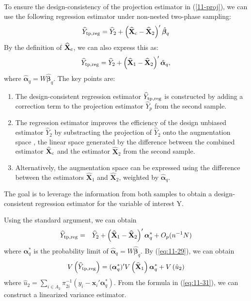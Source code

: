 \documentclass[12pt]{article}
\newcommand{\bx}{\mathbf{x}}
\begin{document}
To ensure the design-consistency of the projection estimator in (\ref{11-proj}), we can use the following regression estimator under non-nested two-phase sampling:
\begin{equation}
\widehat{Y}_{\rm tp, reg} = \widehat{Y}_2 + \left( \widehat{\mathbf{X}}_{\rm c} - \widehat{\mathbf{X}}_2 \right)' \hat{\bm \beta}_q
\label{eq:11-28}
\end{equation} 
By the definition of $\widehat{\mathbf{X}}_{\rm c}$, we can also express this as: 
\begin{equation}
\widehat{Y}_{\rm tp, reg} = \widehat{Y}_2 + \left( \widehat{\mathbf{X}}_{1} - \widehat{\mathbf{X}}_2 \right)' \hat{\bm \alpha}_q,
\label{eq:11-28}
\end{equation} 
where $\hat{\bm \alpha}_q = W \hat{\bm \beta}_q$.
The key points are:
\begin{enumerate}
\item The design-consistent regression estimator $\widehat{Y}_{\rm tp, reg}$ is constructed by adding a correction term to the projection estimator $\widehat{Y}_p$ from the second sample.
\item The regression estimator improves the efficiency of the  design unbiased estimator  $\hat{Y}_2$ by substracting the projection of $\hat{Y}_2$ onto the augmentation space \citep{tsiatis2006}, 
the linear space generated by 
 the difference between the combined estimator $\widehat{\mathbf{X}}_{\rm c}$ and the estimator $\widehat{\mathbf{X}}_2$ from the second sample.
\item 
Alternatively, the augmentation space  can be expressed using the difference between the estimators $\widehat{\mathbf{X}}_{1}$ and $\widehat{\mathbf{X}}_2$, weighted by $\hat{\bm \alpha}_q$.
\end{enumerate} 
The goal is to leverage the information from both samples to obtain a design-consistent regression estimator for the variable of interest Y.

Using the standard argument, we can obtain 
\begin{eqnarray}
\widehat{Y}_{\rm tp, reg} 
&=& \widehat{Y}_2 +  \left( \widehat{\mathbf{X}}_{1} - \widehat{\mathbf{X}}_2 \right)' {\bm \alpha}_q^* + O_p(n^{-1} N) \label{eq:11-29}
\end{eqnarray}
where $\bm \alpha_q^*$ is the probability limit of $\hat{\bm \alpha}_q = W \hat{\bm \beta}_q$. By (\ref{eq:11-29}), 
 we can obtain 
\begin{equation}
V \left( \widehat{Y}_{\rm tp, reg}  \right) 
= ({\bm \alpha}_q^* )' V \left( \widehat{\mathbf{X}}_{1}  \right) {\bm \alpha}_q^* + V\left( \hat{u}_2 \right) 
\label{eq:11-31}
\end{equation}
where $\hat{u}_2 = \sum_{i \in A_2} \pi_{2i}^{-1} \left( y_i -  \bx_i'\bm \alpha_q^* \right) $. From the formula in (\ref{eq:11-31}), we can construct a linearized variance estimator. 
\end{document}
